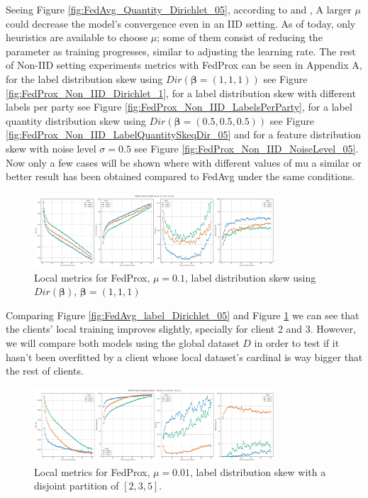 Seeing Figure \ref{fig:FedAvg_Quantity_Dirichlet_05}, according to \cite*{li2020} and \cite*{li2021}, A larger $\mu$  could decrease the model's convergence even in an IID setting. As of today, only heuristics are available to choose $\mu$; some of them consist of reducing the parameter as training progresses, similar to adjusting the learning rate. The rest of Non-IID setting experiments metrics with FedProx can be seen in Appendix A, for the label distribution skew using $Dir(\boldsymbol{\beta} = (1,1,1))$ see Figure \ref{fig:FedProx_Non_IID_Dirichlet_1}, for a label distribution skew with different labels per party see Figure \ref{fig:FedProx_Non_IID_LabelsPerParty}, for a label quantity distribution skew using $Dir(\boldsymbol{\beta}=(0.5,0.5,0.5))$ see Figure \ref{fig:FedProx_Non_IID_LabelQuantitySkeqDir_05} and for a feature distribution skew with noise level $\sigma = 0.5$ see Figure \ref{fig:FedProx_Non_IID_NoiseLevel_05}.\\
Now only a few cases will be shown where with different values of mu a similar or better result has been obtained compared to FedAvg under the same conditions.

\begin{figure}[H]
  \centering
  \includegraphics[width=0.8\textwidth]{figures/2-Federated_Learning/FedProx_Dirichlet_1_mu_0.1.png}
  \caption{Local metrics for FedProx, $\mu = 0.1$, label distribution skew using $Dir(\boldsymbol{\beta})$, $\boldsymbol{\beta} = (1,1,1)$}
  \label{fig:FedProx_LabelsSkewDir_1_Mu_0.1}
\end{figure}

Comparing Figure \ref{fig:FedAvg_label_Dirichlet_05} and Figure \ref{fig:FedProx_LabelsSkewDir_1_Mu_0.1} we can see that the clients' local training improves slightly, specially for client 2 and 3. However, we will compare both models using the global dataset $D$ in order to test if it hasn't been overfitted by a client whose local dataset's cardinal is way bigger that the rest of clients.

\begin{figure}[H]
  \centering
  \includegraphics[width=0.8\textwidth]{figures/2-Federated_Learning/FedProx_LabelsPerParty_mu_0.01.png}
  \caption{Local metrics for FedProx, $\mu = 0.01$, label distribution skew with a disjoint partition of $[2,3,5]$.}
  \label{fig:FedProx_LabelsPerParty_Mu_0.01}
\end{figure}

